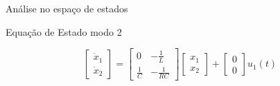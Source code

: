 \documentclass[aspectratio=169]{beamer}
\begin{document}
\begin{frame}{Análise no espaço de estados}


  \begin{block}{Equação de Estado modo 2}
    \begin{center}
      $$\begin{bmatrix} 
        \dot{x}_1 \\ 
        \dot{x}_2 
      \end{bmatrix} = 
      \begin{bmatrix} 
        0 & -\frac{1}{L} \\ 
        \frac{1}{C} & -\frac{1}{RC} 
      \end{bmatrix}
      \begin{bmatrix} 
        x_1 \\ 
        x_2 
      \end{bmatrix} + 
      \begin{bmatrix} 
        0 \\ 
        0  
      \end{bmatrix} u_1(t)$$ 
    \end{center}
  \end{block}
    
\end{frame}
\end{document}
